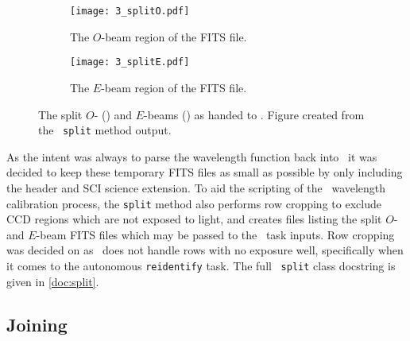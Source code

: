 \begin{figure}[t]
    \centering
    \begin{subfigure}[b]{1.0 \textwidth}
        \centering
        \texttt{[image: 3\_splitO.pdf]}
        \caption{The $O$-beam region of the \gls{FITS} file.}
        \label{subfig:split_O}
    \end{subfigure}
    \centering
    \begin{subfigure}[b]{1.0\textwidth}
        \centering
        \texttt{[image: 3\_splitE.pdf]}
        \caption{The $E$-beam region of the \gls{FITS} file.}
        \label{subfig:split_E}
    \end{subfigure}
    \caption{The split $O$- () and $E$-beams () as handed to \iraf. Figure created from the \stops\ \texttt{split} method output.}
    \label{fig:OE_split}
\end{figure}

As the intent was always to parse the wavelength function back into \polsalt\ it was decided to keep these temporary \gls{FITS} files as small as possible by only including the header and \gls{SCI} science extension.
%
To aid the scripting of the \iraf\ wavelength calibration process, the \texttt{split} method also performs row cropping to exclude \gls{CCD} regions which are not exposed to light, and creates files listing the split $O$- and $E$-beam \gls{FITS} files which may be passed to the \iraf\ task inputs. Row cropping was decided on as \iraf\ does not handle rows with no exposure well, specifically when it comes to the autonomous \texttt{reidentify} task.
The full \stops\ \texttt{split} class docstring is given in \autoref{doc:split}.

\subsection{Joining} \label{subsec:stops_join}



